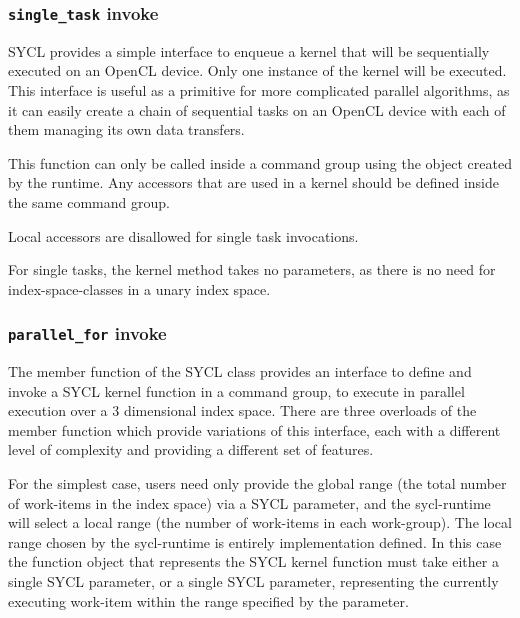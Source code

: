 

\subsubsection{\texttt{single_task} invoke}

SYCL provides a simple interface to enqueue a kernel that will be
sequentially executed on an OpenCL device. Only one instance of the
kernel will be executed. This interface is useful as a primitive for more
complicated parallel algorithms, as it can easily create a chain of
sequential tasks on an OpenCL device with each of them managing its
own data transfers.

This function can only be called inside a command group using the
 object created by the runtime.
Any accessors that are used in a kernel should be defined inside the
same command group.

Local accessors are disallowed for single task invocations.


For single tasks, the kernel method takes no parameters, as there
is no need for \gls{index-space-classes} in a unary index space.

\subsubsection{\texttt{parallel_for} invoke}

The  member function of the SYCL  class provides
an interface to define and invoke a SYCL kernel function in a command group, to execute in
parallel execution over a 3 dimensional index space.
There are three overloads of the  member function which provide
variations of this interface, each with a different level of complexity and providing a
different set of features.

For the simplest case, users need only provide the global range (the total number of work-items in the index space) via a SYCL  parameter, and the \gls{sycl-runtime} will select a local range (the number of work-items in each work-group).
The local range chosen by the \gls{sycl-runtime} is entirely implementation defined.
In this case the function object that represents the SYCL kernel function must take either a single SYCL  parameter, or a single SYCL  parameter, representing the currently executing work-item within the range specified by the  parameter.

